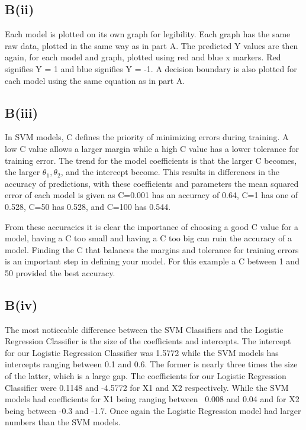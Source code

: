 \documentclass{article}
\begin{document}
\subsection{B(ii)}
Each model is plotted on its own graph for legibility. Each graph has the same raw data, plotted in the same way as in part A. The predicted Y values are then again, for each model and graph, plotted using red and blue x markers. Red signifies Y = 1 and blue signifies Y = -1. A decision boundary is also plotted for each model using the same equation as in part A.

\subsection{B(iii)}
In SVM models, C defines the priority of minimizing errors during training. A low C value allows a larger margin while a high C value has a lower tolerance for training error. The trend for the model coefficients is that the larger C becomes, the larger $\theta_1, \theta_2$, and the intercept become. This results in differences in the accuracy of predictions, with these coefficients and parameters the mean squared error of each model is given as C=0.001 has an accuracy of 0.64, C=1 has one of 0.528, C=50 has 0.528, and C=100 has 0.544.

From these accuracies it is clear the importance of choosing a good C value for a model, having a C too small and having a C too big can ruin the accuracy of a model. Finding the C that balances the margins and tolerance for training errors is an important step in defining your model. For this example a C between 1 and 50 provided the best accuracy.

\subsection{B(iv)}
The most noticeable difference between the SVM Classifiers and the Logistic Regression Classifier is the size of the coefficients and intercepts. The intercept for our Logistic Regression Classifier was 1.5772 while the SVM models has intercepts ranging between 0.1 and 0.6. The former is nearly three times the size of the latter, which is a large gap. The coefficients for our Logistic Regression Classifier were 0.1148 and -4.5772 for X1 and X2 respectively. While the SVM models had coefficients for X1 being ranging between ~0.008 and 0.04 and for X2 being between -0.3 and -1.7. Once again the Logistic Regression model had larger numbers than the SVM models.
\end{document}
